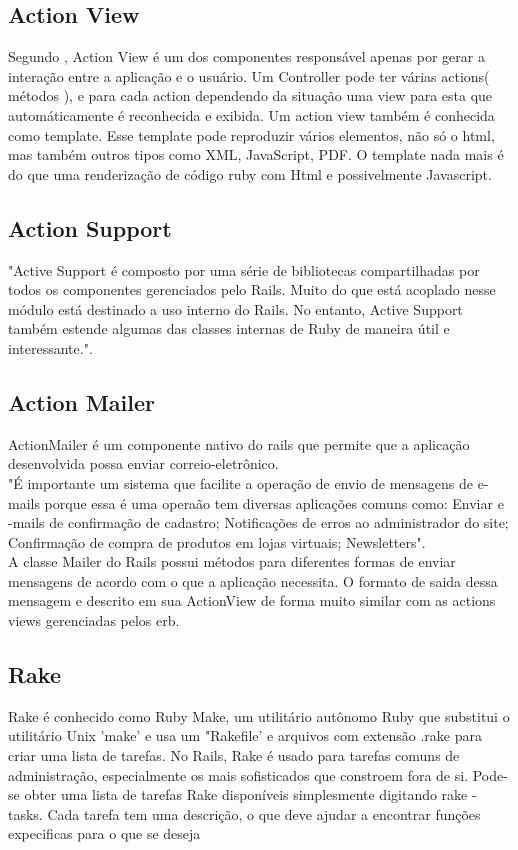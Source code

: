 \subsection{Action View}
Segundo \cite{BAKHARIA}, Action View é um dos componentes responsável apenas por gerar a interação entre a aplicação e o usuário. Um Controller pode ter várias actions( métodos ), e para cada action dependendo da situação uma view para esta que automáticamente é reconhecida e exibida.
Um action view também é conhecida como template. Esse template pode reproduzir vários elementos, não só o html, mas também outros tipos como XML, JavaScript, PDF.
O template nada mais é do que uma renderização de código ruby com Html e possivelmente Javascript.


\subsection{Action Support}
"Active Support é composto por uma série de bibliotecas compartilhadas por todos os componentes gerenciados pelo Rails. 
Muito do que está acoplado nesse módulo está destinado a uso interno do Rails.
No entanto, Active Support também estende algumas das classes internas de Ruby de maneira útil e interessante."\cite{PRAGMATICRUBY}.

\subsection{Action Mailer}
ActionMailer é um componente nativo do rails que permite que a aplicação desenvolvida possa enviar correio-eletrônico. 
\\
"É importante um sistema que facilite a operação de envio de mensagens de e-mails porque
essa é uma operaão tem diversas aplicações comuns como: Enviar e -mails de confirmação de
cadastro; Notificações de erros ao administrador do site; Confirmação de compra de produtos
em lojas virtuais; Newsletters".\cite{BAKHARIA}
\\
\noindent A classe Mailer do Rails possui métodos para diferentes formas de enviar mensagens de acordo com o que a aplicação necessita. O formato de saida dessa mensagem
e descrito em sua ActionView de forma muito similar com as actions views gerenciadas pelos erb.

\subsection{Rake}

Rake é conhecido como Ruby Make, um utilitário autônomo Ruby que substitui o utilitário Unix 'make'
e usa um "Rakefile' e arquivos com extensão .rake para criar uma lista de tarefas. No Rails, Rake é
usado para tarefas comuns de administração, especialmente os mais sofisticados que constroem fora de si.
Pode-se obter uma lista de tarefas Rake disponíveis simplesmente digitando rake - tasks.
Cada tarefa tem uma descrição, o que deve ajudar a encontrar funções expecificas para o que se deseja

